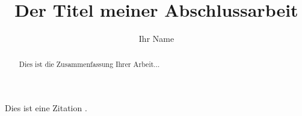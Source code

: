 \documentclass[a4paper,12pt]{report}
\title{Der Titel meiner Abschlussarbeit}
\author{Ihr Name}
\begin{document}
\maketitle

\begin{abstract}
Dies ist die Zusammenfassung Ihrer Arbeit...
\end{abstract}




%
%
%
%

Dies ist eine Zitation \cite{beispiel_artikel}.

\printbibliography
\end{document}
